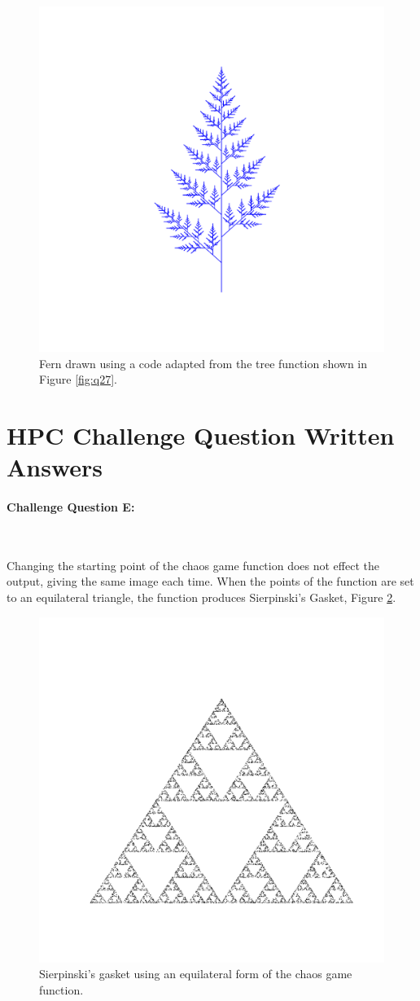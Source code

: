 \documentclass{article}
\begin{document}
\begin{figure}[H]
	\centering
	\includegraphics[width=0.5\linewidth,trim={3cm 3cm 2cm 2cm},clip]{../Results/fern_2.pdf}
	\caption{Fern drawn using a code adapted from the tree function shown in Figure \ref{fig:q27}.}
	\label{fig:q29}
\end{figure}

\newpage
\section*{HPC Challenge Question Written Answers}
 
\paragraph{Challenge Question E:}\

\noindent \newline Changing the starting point of the chaos game function does not effect the output, giving the same image each time. When the points of the function are set to an equilateral triangle, the function produces Sierpinski's Gasket, Figure \ref{fig:E}.

\begin{figure}[H]
	\centering
	\includegraphics[width=0.5\linewidth,trim={1cm 1cm 1cm 1cm},clip]{../Results/s_gasket.pdf}
	\caption{Sierpinski's gasket using an equilateral form of the chaos game function.}
	\label{fig:E}
\end{figure}

	
\end{document}
